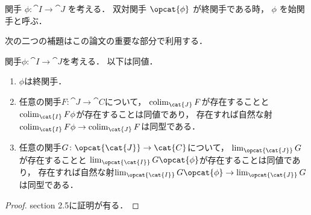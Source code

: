     \begin{Def}[始関手]
        関手 $\phi \colon \cat{I} \to \cat{J}$ を考える．
        双対関手 $\opcat{\phi}$ が終関手である時， $\phi$ を始関手と呼ぶ．
    \end{Def}

    次の二つの補題はこの論文の重要な部分で利用する．

    \begin{Lemma}\label{lemma:final_func_and_lim}
        関手$\phi \colon \cat{I} \to \cat{J}$を考える．
        以下は同値．
        \begin{enumerate}
            \item
                $\phi$は終関手．

            \item
                任意の関手$F \colon \cat{J} \to \cat{C}$について，
                $\colim_{\cat{J}} F$が存在することと
                $\colim_{\cat{I}} F \phi$が存在することは同値であり，
                存在すれば自然な射$\colim_{\cat{I}} F \phi \to \colim_{\cat{J}} F$は同型である．

            \item
                任意の関手$G \colon \opcat{\cat{J}} \to \cat{C}$について，
                $\lim_{\opcat{\cat{J}}} G$が存在することと
                $\lim_{\opcat{\cat{I}}} G \opcat{\phi}$が存在することは同値であり，
                存在すれば自然な射$\lim_{\opcat{\cat{I}}} G \opcat{\phi} \to \lim_{\opcat{\cat{J}}} G$は同型である．
        \end{enumerate}
    \end{Lemma}
    \begin{proof}
        \cite{KS06} section 2.5に証明が有る．
    \end{proof}

